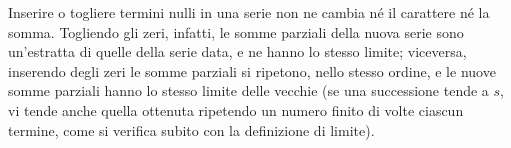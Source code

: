 \begin{osservazione}\label{oss:termini-nulli}
Inserire o togliere termini nulli in una serie non ne cambia né il carattere né la
somma. Togliendo gli zeri, infatti, le somme parziali della nuova serie sono un'estratta
di quelle della serie data, e ne hanno lo stesso limite; viceversa, inserendo degli zeri
le somme parziali si ripetono, nello stesso ordine, e le nuove somme parziali hanno lo
stesso limite delle vecchie (se una successione tende a $s$, vi tende anche quella
ottenuta ripetendo un numero finito di volte ciascun termine, come si verifica subito
con la definizione di limite).
\end{osservazione}
